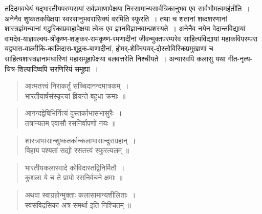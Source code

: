 {\dev तदिदमवधेयं यद्भारतीयपरम्परायां सर्वप्रमाणापेक्षया निस्सामान्यसार्वत्रिकानुभव एव सार्व\-भौमत्वमर्हतीति~। अनेनैव शुष्कतर्कापेक्षया स्वरसानुभवरासिक्यं वरमिति स्फुरति~। तथा च शतानां शब्दशरणानां शास्त्रज्ञंमन्यानां गड्डरिकाप्रवाहापेक्षया त्वेक एव ज्ञानविज्ञानवान्प्रश\-स्यते~। अनेनैव नयेन वेदान्तविद्यायां  वामदेव-याज्ञवल्क्य-श्रीकृष्ण-शङ्कर-रामकृष्ण-रमणा\-दीनां जीवन्मुक्तपरम्परेव साहित्यविद्यायां महाकविपरम्परा यद्व्यास-वाल्मीकि-कालिदास-शूद्रक-बाणादीनां, होमर्-शेक्स्पियर्-दोस्तोविस्किप्रमुखाणां च साहित्यशास्त्रज्ञनामधारिणां महासमूहापेक्षया बलवत्तरेति निश्चीयते~। अन्यास्वपि कलासु यथा गीत-नृत्य-चित्र-शिल्पादिष्वपि सरणिरियं समूह्या~।}
\begin{quote}
{\dev आत्मतत्त्वं निराकर्तुं सच्चिदानन्दमात्रकम्~।}\\
{\dev भारतीयार्षसंस्कृत्यां व्रियन्ते बहुधा क्रमाः ॥}
\end{quote}
\begin{quote}
{\dev आनन्दद्वेषिभिर्नित्यं दुस्तर्काभासभासुरैः~।}\\
{\dev तत्रान्यतम एवासौ रसनिर्वापणो नयः ॥}
\end{quote}
\begin{quote}
{\dev शास्त्राभासान्शुष्कतर्कान्कलाभासान्दुराग्रहान्~।}\\
{\dev विहाय पश्यतां सद्यो रसतत्त्वं स्फुरत्यलम् ॥}
\end{quote}
\begin{quote}
{\dev भारतीयकलास्वादे कोविदास्तद्विनिर्मितौ~।}\\
{\dev कुशला ये च ते प्रायो रसनिर्वचने क्षमाः ॥}
\end{quote}
\begin{quote}
{\dev अथवा स्वाग्रहोन्मुक्ताः कलासामान्यशीलिताः~।}\\
{\dev स्वसंविद्रसिका अत्र समर्था इति निश्चितम् ॥}
\end{quote}


